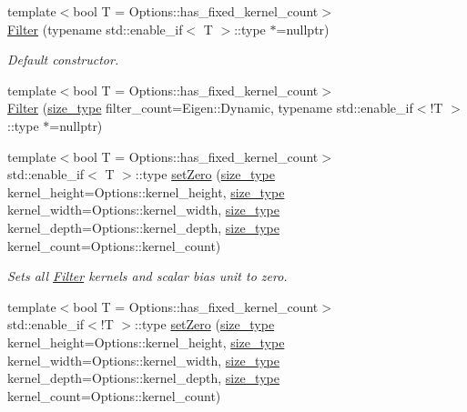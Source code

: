 \begin{DoxyCompactItemize}
\item 
{\footnotesize template$<$bool T = Options\-::has\-\_\-fixed\-\_\-kernel\-\_\-count$>$ }\\\hyperlink{structffnn_1_1layer_1_1convolution_1_1_filter_a92680fc95854201cf47f44ffb91e17e9}{Filter} (typename std\-::enable\-\_\-if$<$ T $>$\-::type $\ast$=nullptr)
\begin{DoxyCompactList}\small\item\em Default constructor. \end{DoxyCompactList}\item 
{\footnotesize template$<$bool T = Options\-::has\-\_\-fixed\-\_\-kernel\-\_\-count$>$ }\\\hyperlink{structffnn_1_1layer_1_1convolution_1_1_filter_ae4efedce4c1e0470bb144b5a1b115465}{Filter} (\hyperlink{namespaceffnn_a63b90a2fd70eb76684eac482a51633e5}{size\-\_\-type} filter\-\_\-count=Eigen\-::\-Dynamic, typename std\-::enable\-\_\-if$<$!T $>$\-::type $\ast$=nullptr)
\item 
{\footnotesize template$<$bool T = Options\-::has\-\_\-fixed\-\_\-kernel\-\_\-count$>$ }\\std\-::enable\-\_\-if$<$ T $>$\-::type \hyperlink{structffnn_1_1layer_1_1convolution_1_1_filter_ac48e60bc36addccf9ac9c10a8afe533d}{set\-Zero} (\hyperlink{namespaceffnn_a63b90a2fd70eb76684eac482a51633e5}{size\-\_\-type} kernel\-\_\-height=Options\-::kernel\-\_\-height, \hyperlink{namespaceffnn_a63b90a2fd70eb76684eac482a51633e5}{size\-\_\-type} kernel\-\_\-width=Options\-::kernel\-\_\-width, \hyperlink{namespaceffnn_a63b90a2fd70eb76684eac482a51633e5}{size\-\_\-type} kernel\-\_\-depth=Options\-::kernel\-\_\-depth, \hyperlink{namespaceffnn_a63b90a2fd70eb76684eac482a51633e5}{size\-\_\-type} kernel\-\_\-count=Options\-::kernel\-\_\-count)
\begin{DoxyCompactList}\small\item\em Sets all \hyperlink{structffnn_1_1layer_1_1convolution_1_1_filter}{Filter} kernels and scalar bias unit to zero. \end{DoxyCompactList}\item 
{\footnotesize template$<$bool T = Options\-::has\-\_\-fixed\-\_\-kernel\-\_\-count$>$ }\\std\-::enable\-\_\-if$<$!T $>$\-::type \hyperlink{structffnn_1_1layer_1_1convolution_1_1_filter_a806c77e5cab9da9dd9761d7bdc2113ea}{set\-Zero} (\hyperlink{namespaceffnn_a63b90a2fd70eb76684eac482a51633e5}{size\-\_\-type} kernel\-\_\-height=Options\-::kernel\-\_\-height, \hyperlink{namespaceffnn_a63b90a2fd70eb76684eac482a51633e5}{size\-\_\-type} kernel\-\_\-width=Options\-::kernel\-\_\-width, \hyperlink{namespaceffnn_a63b90a2fd70eb76684eac482a51633e5}{size\-\_\-type} kernel\-\_\-depth=Options\-::kernel\-\_\-depth, \hyperlink{namespaceffnn_a63b90a2fd70eb76684eac482a51633e5}{size\-\_\-type} kernel\-\_\-count=Options\-::kernel\-\_\-count)

\end{DoxyCompactItemize}
